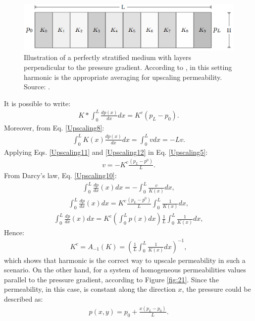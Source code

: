 \begin{figure}
	\centering
	\includegraphics[width=0.7\linewidth]{Images/20}
	\caption{Illustration of a perfectly stratified medium with layers perpendicular to the pressure gradient. According to \cite{Lie2015}, in this setting harmonic is the appropriate averaging for upscaling permeability. Source: \cite{Lie2015}.}
	\label{fig:20}
\end{figure}
\noindent
It is possible to write:
\begin{align}
\label{Upscaling11}
K*\int_{0}^{L}\frac{dp(x)}{dx}dx=K^c(p_L-p_0).
\end{align}
Moreover, from Eq. \ref{Upscaling8}:
\begin{align}
\label{Upscaling12}
\int_{0}^{L}K(x)\frac{dp(x)}{dx}dx= \int_{0}^{L}v dx = -Lv.
\end{align}
Applying Eqs. \ref{Upscaling11} and \ref{Upscaling12} in Eq. \ref{Upscaling5}:
\begin{align}
\label{Upscaling13}
v=-K^c\frac{(p_L-p^0)}{L}.
\end{align}
From Darcy's law, Eq. \ref{Upscaling10}:
\begin{align}
\label{Upscaling14}
\int_{0}^{L}\frac{dp}{dx}(x)dx=-\int_{0}^{L}\frac{v}{K(x)}dx,
\end{align}
\begin{align}
\label{Upscaling15}
\int_{0}^{L}\frac{dp}{dx}(x)dx=K^c\frac{(p_L-p^0)}{L}\int_{0}^{L}\frac{1}{K(x)}dx,
\end{align}
\begin{align}
\label{Upscaling16}
\int_{0}^{L}\frac{dp}{dx}(x)dx=K^c\left(\int_{0}^{L}p(x)dx\right)\frac{1}{L}\int_{0}^{L}\frac{1}{K(x)}dx,
\end{align}
Hence:
\begin{align}
\label{Upscaling17}
K^c=A_{-1}(K)=\left(\frac{1}{L}\int_{0}^{L}\frac{1}{K(x)}dx\right)^{-1},
\end{align}
which shows that harmonic is the correct way to upscale permeability in such a scenario. On the other hand, for a system of homogeneous permeabilities values parallel to the pressure gradient, according to Figure \ref{fig:21}. Since the permeability, in this case, is constant along the direction $x$, the pressure could be described as:
\begin{align}
\label{Upscaling21}
p(x,y)=p_0+\frac{x(p_L-p_0)}{L}.
\end{align}
